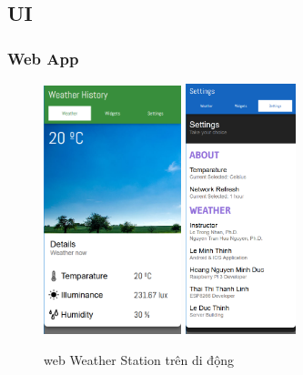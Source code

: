 \documentclass[12pt,titlepage,a4paper]{article}
\begin{document}
\subsection{UI}
\subsubsection{Web App}
\begin{figure}[h]
    \centering
    \includegraphics[width=40mm]{Figures/wea_mobile.png}
    \includegraphics[width=32mm]{Figures/set_mobile.png}
    \caption{web Weather Station trên di động}
    \label{wea_mobile}
\end{figure}
\end{document}

